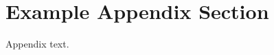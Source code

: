 \documentclass[preprint,12pt,authoryear]{elsarticle}
\begin{document}
\appendix
\section{Example Appendix Section}
\label{app1}

Appendix text.


 


 
\end{document}
